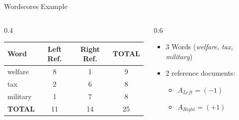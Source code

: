\documentclass[
  ignorenonframetext,
  aspectratio=169]{beamer}
\begin{document}
\begin{frame}{Wordscores Example}
\label{wordscores-example}
\begin{columns}[T]
    \begin{column}{0.4\textwidth}
    \centering
    \footnotesize
    \begin{tabular}{lccc}
    \toprule
    Word & Left Ref. & Right Ref. & TOTAL \\
    \midrule
    welfare & 8 & 1 & 9 \\
    tax & 2 & 6 & 8 \\
    military & 1 & 7 & 8 \\
    \midrule
    \textbf{TOTAL} & 11 & 14 & 25 \\
    \bottomrule
    \end{tabular}
    \end{column}
    \begin{column}{0.6\textwidth}
    \hspace{2.5mm} \begin{itemize}
        \item 3 Words (\emph{welfare, tax, military}) \par \vspace{2.5mm}
        \item 2 reference documents: 
        \begin{itemize}
          \item[] $A_{Left} = (-1)$ 
          \item[] $A_{Right} = (+1)$
        \end{itemize}
    \end{itemize}
    \end{column}
\end{columns}
\end{frame}
\end{document}
